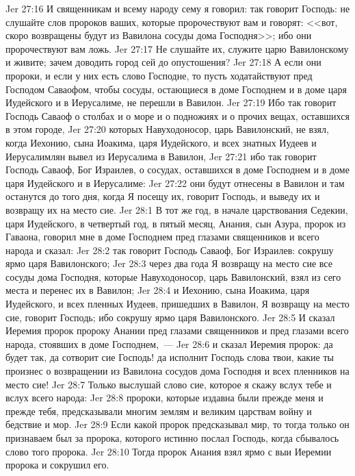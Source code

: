 \vs Jer 27:16 И священникам и всему народу сему я говорил: так говорит Господь: не слушайте слов пророков ваших, которые пророчествуют вам и говорят: <<вот, скоро возвращены будут из Вавилона сосуды дома Господня>>; ибо они пророчествуют вам ложь.
\vs Jer 27:17 Не слушайте их, служите царю Вавилонскому и живите; зачем доводить город сей до опустошения?
\vs Jer 27:18 А если они пророки, и если у них есть слово Господне, то пусть ходатайствуют пред Господом Саваофом, чтобы сосуды, остающиеся в доме Господнем и в доме царя Иудейского и в Иерусалиме, не перешли в Вавилон.
\vs Jer 27:19 Ибо так говорит Господь Саваоф о столбах и о  море и о подножиях и о прочих вещах, оставшихся в этом городе,
\vs Jer 27:20 которых Навуходоносор, царь Вавилонский, не взял, когда Иехонию, сына Иоакима, царя Иудейского, и всех знатных Иудеев и Иерусалимлян вывел из Иерусалима в Вавилон,
\vs Jer 27:21 ибо так говорит Господь Саваоф, Бог Израилев, о сосудах, оставшихся в доме Господнем и в доме царя Иудейского и в Иерусалиме:
\vs Jer 27:22 они будут отнесены в Вавилон и там останутся до того дня, когда Я посещу их, говорит Господь, и выведу их и возвращу их на место сие.
\vs Jer 28:1 В тот же год, в начале царствования Седекии, царя Иудейского, в четвертый год, в пятый месяц, Анания, сын Азура, пророк из Гаваона, говорил мне в доме Господнем пред глазами священников и всего народа и сказал:
\vs Jer 28:2 так говорит Господь Саваоф, Бог Израилев: сокрушу ярмо царя Вавилонского;
\vs Jer 28:3 через два года Я возвращу на место сие все сосуды дома Господня, которые Навуходоносор, царь Вавилонский, взял из сего места и перенес их в Вавилон;
\vs Jer 28:4 и Иехонию, сына Иоакима, царя Иудейского, и всех пленных Иудеев, пришедших в Вавилон, Я возвращу на место сие, говорит Господь; ибо сокрушу ярмо царя Вавилонского.
\vs Jer 28:5 И сказал Иеремия пророк пророку Анании пред глазами священников и пред глазами всего народа, стоявших в доме Господнем,~---
\vs Jer 28:6 и сказал Иеремия пророк: да будет так, да сотворит сие Господь! да исполнит Господь слова твои, какие ты произнес о возвращении из Вавилона сосудов дома Господня и всех пленников на место сие!
\vs Jer 28:7 Только выслушай слово сие, которое я скажу вслух тебе и вслух всего народа:
\vs Jer 28:8 пророки, которые издавна были прежде меня и прежде тебя, предсказывали многим землям и великим царствам войну и бедствие и мор.
\vs Jer 28:9 Если какой пророк предсказывал мир, то тогда только он признаваем был за пророка, которого истинно послал Господь, когда сбывалось слово того пророка.
\vs Jer 28:10 Тогда пророк Анания взял ярмо с выи Иеремии пророка и сокрушил его.
